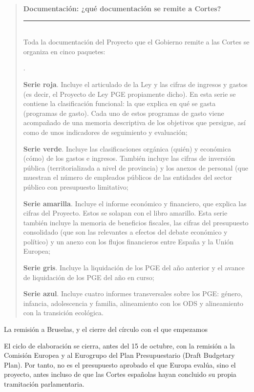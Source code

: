 \documentclass[10pt,a4paper]{article}
\newcounter{numitem}
\newenvironment{lnum}
      {\begin{list}{\arabic{numitem}.}{%
          \usecounter{numitem}%
          \setlength{\leftmargin}{1cm}%
          \setlength{\parskip}{3pt}%
          \setlength{\itemsep}{0pt}%
          \setlength{\parsep}{0pt}%
      }}
      {\end{list}}
\newenvironment{specialblock}[1]{%
      \begin{quote} %
      \small %
      \noindent\textbf{#1}\\[-0.3em] %
      \rule{\linewidth}{0.4pt}\\[0.6em]}{
      \end{quote}}
\newcounter{anexo}
\begin{document}
\begin{specialblock}{\textbf{Documentación}: ¿qué documentación se remite a Cortes?}
    Toda la documentación del Proyecto que el Gobierno remite a las Cortes se organiza en cinco paquetes:
    \begin{lnum}
        \item \textbf{Serie roja}. Incluye el articulado de la Ley y las cifras de ingresos y gastos (es decir, el Proyecto de Ley PGE propiamente dicho). En esta serie se contiene la clasificación funcional: la que explica en qué se gasta (programas de gasto). Cada uno de estos programas de gasto viene acompañado de una memoria descriptiva de los objetivos que persigue, así como de unos indicadores de seguimiento y evaluación;
        \item \textbf{Serie verde}. Incluye las clasificaciones orgánica (quién) y económica (cómo) de los gastos e ingresos. También incluye las cifras de inversión pública (territorializada a nivel de provincia) y los anexos de personal (que muestran el número de empleados públicos de las entidades del sector público con presupuesto limitativo;
        \item \textbf{Serie amarilla}. Incluye el informe económico y financiero, que explica las cifras del Proyecto. Estos se solapan con el libro amarillo. Esta serie también incluye la memoria de beneficios fiscales, las cifras del presupuesto consolidado (que son las relevantes a efectos del debate económico y político) y un anexo con los flujos financieros entre España y la Unión Europea;
        \item \textbf{Serie gris}. Incluye la liquidación de los PGE del año anterior y el avance de liquidación de los PGE del año en curso;
        \item \textbf{Serie azul}. Incluye cuatro informes transversales sobre los PGE: género, infancia, adolescencia y familia, alineamiento con los ODS y alineamiento con la transición ecológica.
    \end{lnum}
\end{specialblock}

La remisión a Bruselas, y el cierre del círculo con el que empezamos

El ciclo de elaboración se cierra, antes del 15 de octubre, con la remisión a la Comisión Europea y al Eurogrupo del Plan Presupuestario (Draft Budgetary Plan). Por tanto, no es el presupuesto aprobado el que Europa evalúa, sino el proyecto, antes incluso de que las Cortes españolas hayan concluido su propia tramitación parlamentaria. 
\end{document}
